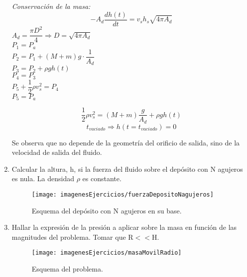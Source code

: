 \begin{enumerate}
\blue
	\textit{Conservación de la masa:}
		\[-A_d \dfrac{dh(t)}{dt} = v_s h_s \sqrt{4\pi A_d}\]
		$A_d = \dfrac{\pi D^2}{4} \Rightarrow D = \sqrt{4\pi A_d}$\\
		$P_1 = P_a$\\
		$P_2 = P_1 + (M + m)g \cdot \dfrac{1}{A_d}$\\
		$P_3 = P_2 + \rho g h(t)$\\
		$P_4 = P_3$\\
		$P_5 + \dfrac{1}{2}\rho v_s^2 = P_4$\\
		$P_5 = P_a$
		
		\[\dfrac{1}{2}\rho v_s^2 = (M + m)\dfrac{g}{A_d} + \rho g h(t)\]
		\[t_{vaciado} \Rightarrow h(t = t_{vaciado}) = 0\]
		
	Se observa que no depende de la geometría del orificio de salida, sino de la velocidad de salida del fluido.
\black
\newpage
\item Calcular la altura, h, si la fuerza del fluido sobre el depósito con N agujeros es nula. La densidad $\rho$ es constante.
\begin{figure}[H]
	\centering
	\texttt{[image: imagenesEjercicios/fuerzaDepositoNagujeros]}
	\caption{Esquema del depósito con N agujeros en su base.}
	\label{fig:fuerzadepositonagujeros}
\end{figure}

\item Hallar la expresión de la presión a aplicar sobre la masa en función de las magnitudes del problema. Tomar que R$<<$H.

\begin{figure}[H]
	\centering
	\texttt{[image: imagenesEjercicios/masaMovilRadio]}
	\caption{Esquema del problema.}
	\label{fig:masamovilradio}
\end{figure}



\end{enumerate}
\black
